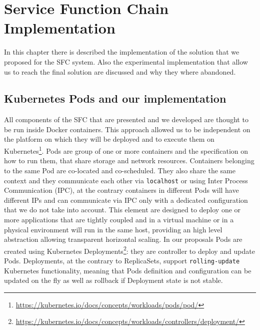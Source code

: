 \chapter{Service Function Chain Implementation}
\label{chap:impl}

\newcommand{\enchainer}{\texttt{Enchainer}}
\newcommand{\vnf}{\texttt{VNF}}
\newcommand{\vnfs}{\texttt{VNFs}}
\newcommand{\dispatcher}{\texttt{Dispatcher}}
\newcommand{\astaire}{\texttt{Astaire}}
\newcommand{\ironhide}{\texttt{Ironhide}}
\newcommand{\harbor}{\texttt{Harbor}}
\newcommand{\roulette}{\texttt{Roulette}}
\newcommand{\ingress}{\texttt{ingress}}
\newcommand{\ingresses}{\texttt{ingresses}}
\newcommand{\egress}{\texttt{egress}}
\newcommand{\egresses}{\texttt{egresses}}

In this chapter there is described the implementation of the solution that we
proposed for the SFC system. Also the experimental implementation that allow us
to reach the final solution are discussed and why they where abandoned.

\section{Kubernetes Pods and our implementation}
All components of the SFC that are presented and we developed are thought to be
run inside Docker containers. This approach allowed us to be independent on the
platform on which they will be deployed and to execute them on
Kubernetes\footnote{\url{https://kubernetes.io/docs/concepts/workloads/pods/pod/}}.
Pods are group of one or more containers and the specification on how to run
them, that share storage and network resources. Containers belonging to the same
Pod are co-located and co-scheduled. They also share the same context and they
communicate each other via \texttt{localhost} or using Inter Process
Communication (IPC), at the contrary containers in different Pods will have
different IPs and can communicate via IPC only with a dedicated configuration
that we do not take into account. This element are designed to deploy one or
more applications that are tightly coupled and in a virtual machine or in a
physical environment will run in the same host, providing an high level
abstraction allowing transparent horizontal scaling. In our proposals Pods are
created using Kubernetes
Deployments\footnote{\url{https://kubernetes.io/docs/concepts/workloads/controllers/deployment/}}:
they are controller to deploy and update Pods. Deployments, at the contrary to
ReplicaSets, support \texttt{rolling-update} Kubernetes functionality, meaning
that Pods definition and configuration can be updated on the fly as well as
rollback if Deployment state is not stable. 

